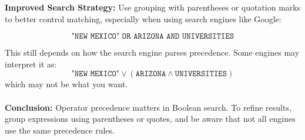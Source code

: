 \begin{tcolorbox}[title=Example 2: Boolean Searching with OR and AND Precedence]
\textbf{Improved Search Strategy:}  
Use grouping with parentheses or quotation marks to better control matching, especially when using search engines like Google:

\[
\texttt{"NEW MEXICO" OR ARIZONA AND UNIVERSITIES}
\]

This still depends on how the search engine parses precedence. Some engines may interpret it as:
\[
\texttt{"NEW MEXICO"} \lor (\texttt{ARIZONA} \land \texttt{UNIVERSITIES})
\]
which may not be what you want.
\\ \\
\textbf{Conclusion:}  
Operator precedence matters in Boolean search. To refine results, group expressions using parentheses or quotes, and be aware that not all engines use the same precedence rules.
\end{tcolorbox}

